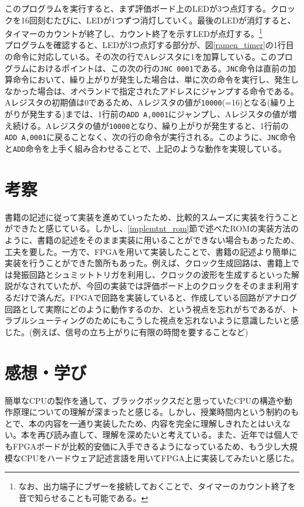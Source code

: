 \documentclass[dvipdfmx,a4j, titlepage]{jsarticle}
\begin{document}
このプログラムを実行すると、まず評価ボード上のLEDが3つ点灯する。クロックを16回刻むたびに、LEDが1つずつ消灯していく。最後のLEDが消灯すると、タイマーのカウントが終了し、カウント終了を示すLEDが点灯する。\footnote{なお、出力端子にブザーを接続しておくことで、タイマーのカウント終了を音で知らせることも可能である。}\\
プログラムを確認すると、LEDが3つ点灯する部分が、図\ref{ramen_timer}の1行目の命令に対応している。その次の行でAレジスタに1を加算している。このプログラムにおけるポイントは、この次の行の\verb|JNC 0001|である。\verb|JNC|命令は直前の加算命令において、繰り上がりが発生した場合は、単に次の命令を実行し、発生しなかった場合は、オペランドで指定されたアドレスにジャンプする命令である。Aレジスタの初期値は0であるため、Aレジスタの値が\verb|10000|(=16)となる(繰り上がりが発生する)までは、1行前の\verb|ADD A,0001|にジャンプし、Aレジスタの値が増え続ける。Aレジスタの値が\verb|10000|となり、繰り上がりが発生すると、1行前の\verb|ADD A,0001|に戻ることなく、次の行の命令が実行される。このように、\verb|JNC|命令と\verb|ADD|命令を上手く組み合わせることで、上記のような動作を実現している。\\

\section{考察}
書籍の記述に従って実装を進めていったため、比較的スムーズに実装を行うことができたと感じている。しかし、\ref{implemtnt_rom}節で述べたROMの実装方法のように、書籍の記述をそのまま実装に用いることができない場合もあったため、工夫を要した。一方で、FPGAを用いて実装したことで、書籍の記述より簡単に実装を行うことができた箇所もあった。例えば、クロック生成回路は、書籍上では発振回路とシュミットトリガを利用し、クロックの波形を生成するといった解説がなされていたが、今回の実装では評価ボード上のクロックをそのまま利用するだけで済んだ。FPGAで回路を実装していると、作成している回路がアナログ回路として実際にどのように動作するのか、という視点を忘れがちであるが、トラブルシューティングのためにもこうした視点を忘れないように意識したいと感じた。(例えば、信号の立ち上がりに有限の時間を要することなど)\\

\section{感想・学び}
簡単なCPUの製作を通して、ブラックボックスだと思っていたCPUの構造や動作原理についての理解が深まったと感じる。しかし、授業時間内という制約のもとで、本の内容を一通り実装したため、内容を完全に理解しきれたとはいえない。本を再び読み直して、理解を深めたいと考えている。また、近年では個人でもFPGAボードが比較的安価に入手できるようになっているため、もう少し大規模なCPUをハードウェア記述言語を用いてFPGA上に実装してみたいと感じた。
\end{document}
